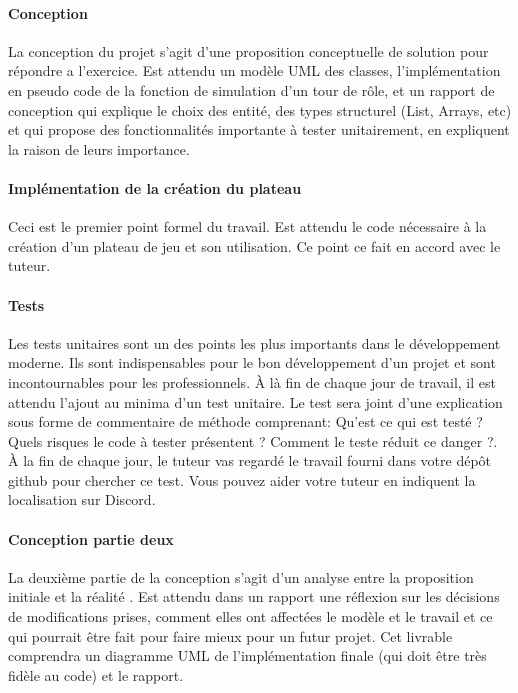 \documentclass[12pt]{article}
\begin{document}
	
	\paragraph{Conception} 
		La conception du projet s'agit d'une proposition conceptuelle de solution pour répondre a l'exercice. 
		Est attendu un modèle UML des classes, l'implémentation en pseudo code de la fonction de simulation d'un tour de rôle, et un rapport de conception qui explique le choix des entité, des types structurel (List, Arrays, etc) et qui propose des fonctionnalités importante à tester unitairement, en expliquent la raison de leurs importance.
		
	\paragraph{Implémentation de la création du plateau}
		Ceci est le premier point formel du travail.  Est attendu le code nécessaire à la création d'un plateau de jeu et son utilisation. 
		Ce point ce fait en accord avec le tuteur.
		
	\paragraph{Tests}
		Les tests unitaires sont un des points les plus importants dans le développement moderne. Ils sont indispensables pour le bon développement d'un projet et sont incontournables pour les professionnels.
		À là fin de chaque jour de travail, il est attendu l'ajout au minima d'un test unitaire.
		Le test sera joint d'une explication sous forme de commentaire de méthode comprenant: Qu'est ce qui est testé ? Quels risques le code à tester présentent ? Comment le teste réduit ce danger ?.
		À la fin de chaque jour, le tuteur vas regardé le travail fourni dans votre dépôt github pour chercher ce test. Vous pouvez aider votre tuteur en indiquent la localisation sur Discord. 
		
	\paragraph{Conception partie deux }
		La deuxième partie de la conception s'agit d'un analyse entre la proposition initiale et la réalité . 
		Est attendu dans un rapport une réflexion sur les décisions de modifications prises, comment elles ont affectées le modèle et le travail et ce qui pourrait être fait pour faire mieux pour un futur projet. 
		Cet livrable comprendra un diagramme UML de l'implémentation finale (qui doit être très fidèle au code) et le rapport. 
	
\end{document}

